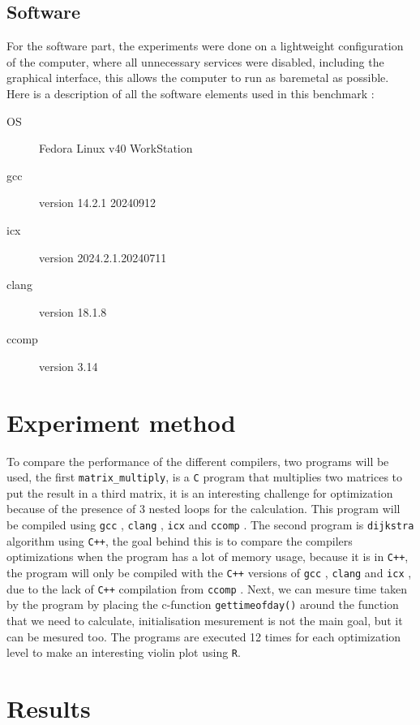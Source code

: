 \documentclass{rapport}
\newcommand{\gcc}{\texttt{gcc} }
\newcommand{\icx}{\texttt{icx} }
\newcommand{\clang}{\texttt{clang} }
\newcommand{\comp}{\texttt{ccomp} }
\begin{document}
\subsection*{Software}
For the software part, the experiments were done on a lightweight configuration of the computer, where all unnecessary services were disabled, 
including the graphical interface, this allows the computer to run as baremetal as possible. \newline
Here is a description of all the software elements used in this benchmark :
\begin{description}
    \item[OS] Fedora Linux v40 WorkStation
    \item[gcc] version 14.2.1 20240912
    \item[icx] version 2024.2.1.20240711
    \item[clang] version 18.1.8
    \item[ccomp] version 3.14
\end{description}

\section{Experiment method}
To compare the performance of the different compilers, two programs will be used, the first \texttt{matrix\_multiply}, is a \texttt{C} program 
that multiplies two matrices to put the result in a third matrix, it is an interesting challenge for optimization because of the presence of 3 nested loops for 
the calculation. This program will be compiled using \gcc, \clang, \icx and \comp. \newline
The second program is \texttt{dijkstra} algorithm using \texttt{C++}, the goal behind this is to compare the compilers optimizations when the program has a lot
of memory usage, because it is in \texttt{C++}, the program will only be compiled with the \texttt{C++} versions of \gcc, \clang and \icx, due to the lack of \texttt{C++}
compilation from \comp. \newline
Next, we can mesure time taken by the program by placing the c-function \texttt{gettimeofday()} around the function that we need to calculate, initialisation 
mesurement is not the main goal, but it can be mesured too. The programs are executed 12 times for each optimization level to make an interesting violin plot using \texttt{R}.

\section{Results}
\end{document}
